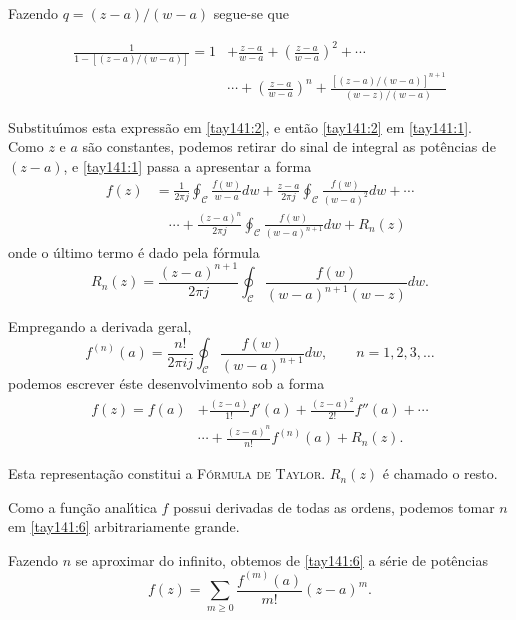 Fazendo $q =(z - a)/(w- a)$ segue-se que

\begin{align*}
\frac{1}{1-[(z-a)/(w-a)]} = 1 &+ \frac{z - a}{w-a} +
\left(\frac{z- a}{w-a}\right)^2 +\cdots\\[2ex]
&\cdots+ \left(\frac{z- a}{w - a}\right)^n+\frac{[(z - a)/(w -
a)]^{n+1}}{(w - z)/(w - a)}
\end{align*}

Substitu\'{\i}mos esta express\~{a}o em \eqref{tay141:2}, e ent\~{a}o
\eqref{tay141:2} em \eqref{tay141:1}. Como $z$ e $a$ s\~{a}o
constantes, podemos retirar do sinal de integral as pot\^{e}ncias de
$(z - a)$, e \eqref{tay141:1} passa a apresentar a forma
\begin{align}\label{tay141:4}
  f(z)&=\frac{1}{2\pi j}\oint_{\mathcal{C}}\frac{f(w)}{w-a}dw+
  \frac{z-a}{2\pi j}\oint_{\mathcal{C}}\frac{f(w)}{(w-a)^2}dw+\cdots \nonumber\\[2ex]
   &\quad\cdots + \frac{(z-a)^n}{2\pi j}\oint_{\mathcal{C}}\frac{f(w)}{(w-a)^{n+1}}dw+R_n(z)
\end{align}
onde o \'{u}ltimo termo \'{e} dado pela f\'{o}rmula
\begin{equation}\label{tay141:5}
R_n(z)=  \frac{(z- a)^{n+1}}{ 2\pi
j}\oint_{\mathcal{C}}\frac{f(w)}{(w-a)^{n+1}(w-z)}dw.
\end{equation}

Empregando a derivada geral,
\begin{equation*}
  f^{(n)}(a)=\frac{n!}{2\pi
  ij}\oint_{\mathcal{C}}\frac{f(w)}{(w-a)^{n+1}}dw,\qquad
  n=1,2,3,\ldots
\end{equation*}
podemos escrever \'{e}ste desenvolvimento sob a forma
\begin{align}\label{tay141:6}
f(z)= f(a)&+ \frac{(z-a)}{1!} f'(a)+\frac{(z - a)^2}{2!}f''(a)+\cdots\nonumber\\[2ex]
   &\cdots+ \frac{(z - a)^n}{n!} f^{(n)}(a) + R_n(z).
\end{align}

Esta representa\c{c}\~{a}o constitui a \textsc{F\'{o}rmula de Taylor}.
$R_n(z)$ \'{e} chamado o resto.

Como a fun\c{c}\~{a}o anal\'{\i}tica $f$ possui derivadas de todas as ordens,
podemos tomar $n$ em \eqref{tay141:6} arbitrariamente grande.

Fazendo $n$ se aproximar do infinito, obtemos de \eqref{tay141:6}
a s\'{e}rie de pot\^{e}ncias
\begin{equation}\label{tay141:7}
f(z)=\sum_{m\geq 0}\frac{f^{(m)}(a)}{m!}(z - a)^m.
\end{equation}

